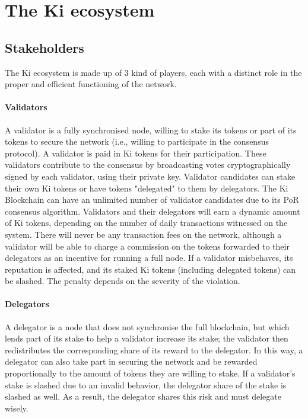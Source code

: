 \section{The Ki ecosystem }
\subsection{Stakeholders}
The Ki ecosystem is made up of 3 kind of players, each with a distinct role in the proper and efficient functioning of the network.
\paragraph{Validators}
A validator is a fully synchronised node, willing to stake its tokens or part of its tokens to secure the network (i.e., willing to participate in the consensus protocol). A validator is paid in Ki tokens for their participation. These validators contribute to the consensus by broadcasting votes cryptographically signed by each validator, using their private key.
Validator candidates can stake their own Ki tokens or have tokens "delegated" to them by delegators. The Ki Blockchain can have an unlimited number of validator candidates due to its PoR consensus algorithm.
Validators and their delegators will earn a dynamic amount of Ki tokens, depending on the number of daily transactions witnessed on the system. There will never be any transaction fees on the network, although a validator will be able to charge a commission on the tokens forwarded to their delegators as an incentive for running a full node. 
If a validator misbehaves, its reputation is affected, and its staked Ki tokens (including delegated tokens) can be slashed. The penalty depends on the severity of the violation.
\paragraph{Delegators}
A delegator is a node that does not synchronise the full blockchain, but which lends part of its stake to help a validator increase its stake; the validator then redistributes the corresponding share of its reward to the delegator.
In this way, a delegator can also take part in securing the network and be rewarded proportionally to the amount of tokens they are willing to stake. If a validator’s stake is slashed due to an invalid behavior, the delegator share of the stake is slashed as well. As a result, the delegator shares this risk and must delegate wisely.

